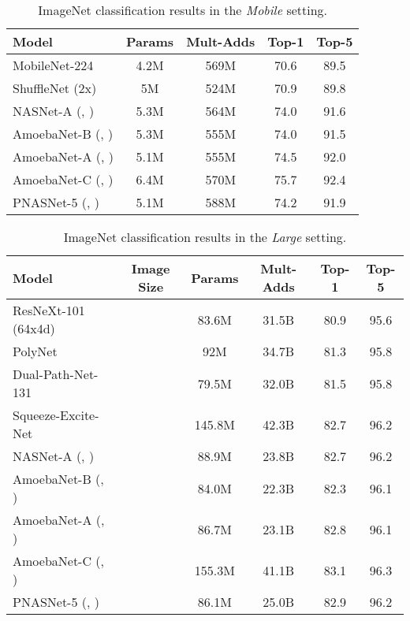 \documentclass[runningheads]{llncs}
\begin{document}
\begin{table}[t]
\begin{center}
\begin{tabular}{lcccc}
    \toprule
         Model &  Params & Mult-Adds & Top-1 & Top-5 \\
        \midrule
        MobileNet-224 \cite{DBLP:journals/corr/HowardZCKWWAA17} & 4.2M & 569M & 70.6 & 89.5 \\
        ShuffleNet (2x) \cite{DBLP:journals/corr/ZhangZLS17} & 5M & 524M & 70.9 & 89.8 \\
        \midrule
        NASNet-A (, )
        \cite{DBLP:journals/corr/ZophVSL17} & 5.3M & 564M & 74.0 & 91.6 \\
        AmoebaNet-B (, ) \cite{DBLP:journals/corr/abs-1802-01548} & 5.3M & 555M & 74.0 & 91.5 \\
        AmoebaNet-A (, ) \cite{DBLP:journals/corr/abs-1802-01548} & 5.1M & 555M & 74.5 & 92.0 \\
AmoebaNet-C (, ) \cite{DBLP:journals/corr/abs-1802-01548} & 6.4M & 570M & 75.7 & 92.4 \\
        \midrule
        PNASNet-5 (, ) & 5.1M & 588M & 74.2 & 91.9 \\
    \bottomrule
    \end{tabular}
\end{center}
\caption{ImageNet classification results in the \textit{Mobile} setting.
}
\label{tab:imagenet-mobile}
\end{table}
\begin{table}[t]
\begin{center}
    \begin{tabular}{lccccc}
    \toprule
        Model & Image Size & Params & Mult-Adds & Top-1 & Top-5 \\
        \midrule
        ResNeXt-101 (64x4d) \cite{DBLP:journals/corr/XieGDTH16} &  & 83.6M & 31.5B & 80.9 & 95.6\\
        PolyNet \cite{DBLP:journals/corr/ZhangLLL16} &  & 92M & 34.7B & 81.3 & 95.8\\
        Dual-Path-Net-131 \cite{DBLP:journals/corr/ChenLXJYF17} &  & 79.5M & 32.0B & 81.5 & 95.8\\
        Squeeze-Excite-Net \cite{DBLP:journals/corr/abs-1709-01507} &  & 145.8M & 42.3B & 82.7 & 96.2\\
        \midrule
        NASNet-A (, ) \cite{DBLP:journals/corr/ZophVSL17} &  & 88.9M & 23.8B & 82.7 & 96.2\\
        AmoebaNet-B (, ) \cite{DBLP:journals/corr/abs-1802-01548} &  & 84.0M & 22.3B & 82.3 & 96.1 \\
        AmoebaNet-A (, ) \cite{DBLP:journals/corr/abs-1802-01548} &  & 86.7M & 23.1B & 82.8 & 96.1 \\
AmoebaNet-C (, ) \cite{DBLP:journals/corr/abs-1802-01548} &  & 155.3M & 41.1B & 83.1 & 96.3 \\
        \midrule
        PNASNet-5 (, ) &  & 86.1M & 25.0B & 82.9 & 96.2 \\
    \bottomrule
    \end{tabular}
\end{center}
\caption{ImageNet classification results in the \textit{Large} setting.}
\label{tab:imagenet-large}
\end{table}
  
\end{document}
